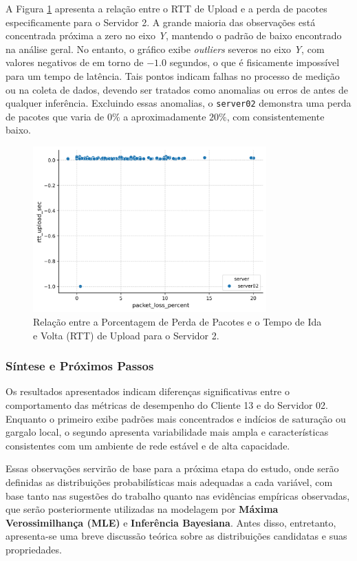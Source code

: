 \documentclass{article}
\begin{document}
A Figura \ref{fig:scatter_server02} apresenta a relação entre o RTT de Upload e a perda de pacotes especificamente para o Servidor 2. A grande maioria das observações está concentrada próxima a zero no eixo \textit{Y}, mantendo o padrão de baixo  encontrado na análise geral. No entanto, o gráfico exibe \textit{outliers} severos no eixo \textit{Y}, com valores negativos de  em torno de $-1.0$ segundos, o que é fisicamente impossível para um tempo de latência. Tais pontos indicam falhas no processo de medição ou na coleta de dados, devendo ser tratados como anomalias ou erros de  antes de qualquer inferência. Excluindo essas anomalias, o \texttt{server02} demonstra uma perda de pacotes que varia de $0\%$ a aproximadamente $20\%$, com  consistentemente baixo.

\begin{figure}[htp]
	\centering
	\includegraphics[width=0.8\textwidth]{../figures/eda/scatter_server02.png}
	\caption{Relação entre a Porcentagem de Perda de Pacotes e o Tempo de Ida e Volta (RTT) de Upload para o Servidor 2.}
	\label{fig:scatter_server02}
\end{figure}

\subsubsection{Síntese e Próximos Passos}
Os resultados apresentados indicam diferenças significativas entre o comportamento das métricas de desempenho do Cliente 13 e do Servidor 02.  
Enquanto o primeiro exibe padrões mais concentrados e indícios de saturação ou gargalo local, o segundo apresenta variabilidade mais ampla e características consistentes com um ambiente de rede estável e de alta capacidade.  

Essas observações servirão de base para a próxima etapa do estudo, onde serão definidas as distribuições probabilísticas mais adequadas a cada variável, com base tanto nas sugestões do trabalho quanto nas evidências empíricas observadas, que serão posteriormente utilizadas na modelagem por \textbf{Máxima Verossimilhança (MLE)} e \textbf{Inferência Bayesiana}.  
Antes disso, entretanto, apresenta-se uma breve discussão teórica sobre as distribuições candidatas e suas propriedades.
\end{document}
